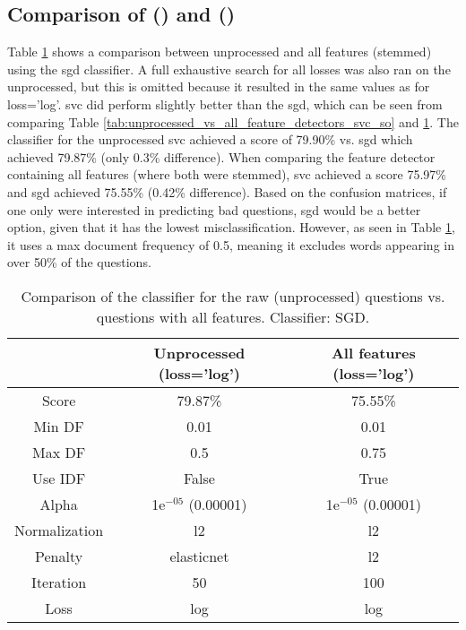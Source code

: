\subsection[Comparison of SVC and SGD]{Comparison of  () and  ()}
\label{sec:comparing_svc_sgd}
Table \ref{tab:unprocessed_vs_all_feature_detectors_sgd_so} shows a comparison between unprocessed and all features (stemmed) using the \gls{sgd} classifier.
A full exhaustive search for all losses was also ran on the unprocessed, but this is omitted because it resulted in the same values as for loss='log'.
\vspace{0.5em}\newline
\gls{svc} did perform slightly better than the \gls{sgd}, which can be seen from comparing Table \ref{tab:unprocessed_vs_all_feature_detectors_svc_so} and \ref{tab:unprocessed_vs_all_feature_detectors_sgd_so}.
The classifier for the unprocessed \gls{svc} achieved a score of 79.90\% vs. \gls{sgd} which achieved 79.87\% (only 0.3\% difference).
When comparing the feature detector containing all features (where both were stemmed), \gls{svc} achieved a score 75.97\% and \gls{sgd} achieved 75.55\% (0.42\% difference). 
\vspace{0.5em}\newline	
Based on the confusion matrices, if one only were interested in predicting bad questions, \gls{sgd} would be a better option, given that it has the lowest misclassification.
However, as seen in Table \ref{tab:unprocessed_vs_all_feature_detectors_sgd_so}, it uses a max document frequency of 0.5, meaning it excludes words appearing in over 50\% of the questions.

\begin{table}[!h]%
	\centering
	\begin{tabular}{| c | c | c |}
		\hline
		~				& Unprocessed (loss='log')	& All features (loss='log')	\\ \hline
		Score 			& 79.87\%					& 75.55\%					\\ \hline
		Min DF 			& 0.01						& 0.01						\\ \hline
		Max DF 			& 0.5						& 0.75						\\ \hline
		Use IDF			& False						& True						\\ \hline
		Alpha 			& 1e$^{-05}$ (0.00001)		& 1e$^{-05}$ (0.00001)		\\ \hline
		Normalization 	& l2						& l2						\\ \hline		
		Penalty 		& elasticnet				& l2						\\ \hline
		Iteration 		& 50						& 100						\\ \hline
		Loss 			& log						& log						\\ \hline		
	\end{tabular}
	\caption{Comparison of the classifier for the raw (unprocessed) questions vs. questions with all features. Classifier: SGD.}
	\label{tab:unprocessed_vs_all_feature_detectors_sgd_so}
\end{table}


